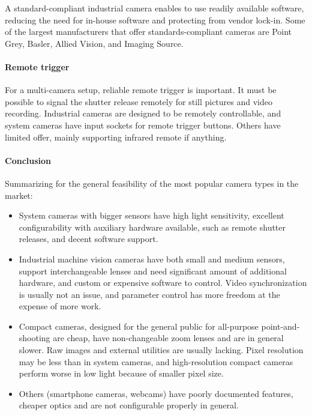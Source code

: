 A standard-compliant industrial camera enables to use readily available software, reducing the need for in-house software and protecting from vendor lock-in.
Some of the largest manufacturers that offer standards-compliant cameras are Point Grey, Basler, Allied Vision, and Imaging Source.



\paragraph{Remote trigger}
For a multi-camera setup, reliable remote trigger is important.
It must be possible to signal the shutter release remotely for still pictures and video recording.
Industrial cameras are designed to be remotely controllable, and system cameras have input sockets for remote trigger buttons.
Others have limited offer, mainly supporting infrared remote if anything.


\paragraph{Conclusion}
Summarizing for the general feasibility of the most popular camera types in the market:

\begin{itemize}
	\item System cameras with bigger sensors have high light sensitivity, excellent configurability with auxiliary hardware available, such as remote shutter releases, and decent software support.
	\item Industrial machine vision cameras have both small and medium sensors, support interchangeable lenses and need significant amount of additional hardware, and custom or expensive software to control. Video synchronization is usually not an issue, and parameter control has more freedom at the expense of more work.
	\item Compact cameras, designed for the general public for all-purpose point-and-shooting are cheap, have non-changeable zoom lenses and are in general slower. Raw images and external utilities are usually lacking. Pixel resolution may be less than in system cameras, and high-resolution compact cameras perform worse in low light because of smaller pixel size.
	\item Others (smartphone cameras, webcams) have poorly documented features, cheaper optics and are not configurable properly in general.
\end{itemize}

